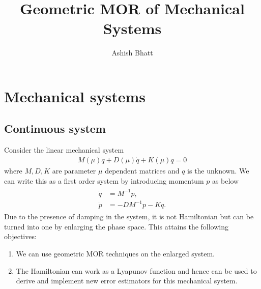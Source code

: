 \documentclass[12pt,a4paper,draft]{article}
\author{Ashish Bhatt}
\title{Geometric MOR of Mechanical Systems}
\begin{document}
\maketitle

\section{Mechanical systems}
\subsection{Continuous system}
Consider the linear mechanical system
\begin{align}
M(\mu)\ddot{q} + D(\mu) \dot{q} + K(\mu) q = 0
\end{align}
where $M, D, K$ are parameter $\mu$ dependent matrices and $q$ is the unknown. We can write this as a first order system by introducing momentum $p$ as below
\begin{gather}
\begin{aligned}
\dot{q} &= M^{-1}p, \\
\dot{p} &= -DM^{-1}p - Kq.
\end{aligned}
\end{gather}
Due to the presence of damping in the system, it is not Hamiltonian but can be turned into one by enlarging the phase space. This attains the following objectives:
\begin{enumerate}
\item We can use geometric MOR techniques on the enlarged system.
\item The Hamiltonian can work as a Lyapunov function and hence can be used to derive and implement new error estimators for this mechanical system.
\end{enumerate}
\end{document}
